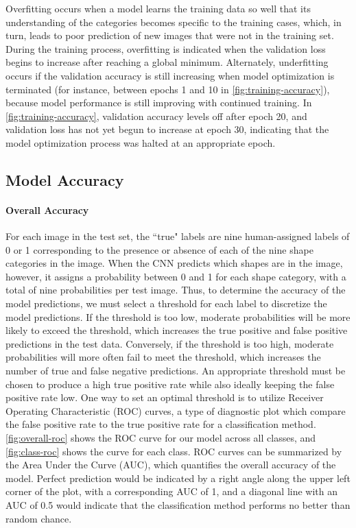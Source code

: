 \documentclass{article}\usepackage[]{graphicx}\usepackage[table]{xcolor}
\begin{document}
Overfitting occurs when a model learns the training data so well that its understanding of the categories becomes specific to the training cases, which, in turn, leads to poor prediction of new images that were not in the training set. During the training process, overfitting is indicated when the validation loss begins to increase after reaching a global minimum. Alternately, underfitting occurs if the validation accuracy is still increasing when model optimization is terminated (for instance, between epochs 1 and 10 in \autoref{fig:training-accuracy}), because model performance is still improving with continued training. In \autoref{fig:training-accuracy}, validation accuracy levels off after epoch 20, and validation loss has not yet begun to increase at epoch 30, indicating that the model optimization process was halted at an appropriate epoch.

\subsection{Model Accuracy}

\paragraph{Overall Accuracy}
For each image in the test set, the ``true" labels are nine human-assigned labels of 0 or 1 corresponding to the presence or absence of each of the nine shape categories in the image. When the CNN predicts which shapes are in the image, however, it assigns a probability between 0 and 1 for each shape category, with a total of nine probabilities per test image. Thus, to determine the accuracy of the model predictions, we must select a threshold for each label to discretize the model predictions. If the threshold is too low, moderate probabilities will be more likely to exceed the threshold, which increases the true positive and false positive predictions in the test data. Conversely, if the threshold is too high, moderate probabilities will more often fail to meet the threshold, which increases the number of true and false negative predictions. An appropriate threshold must be chosen to produce a high true positive rate while also ideally keeping the false positive rate low. One way to set an optimal threshold is to utilize Receiver Operating Characteristic (ROC) curves, a type of diagnostic plot which compare the false positive rate to the true positive rate for a classification method. \autoref{fig:overall-roc} shows the ROC curve for our model across all classes, and \autoref{fig:class-roc} shows the curve for each class. ROC curves can be summarized by the Area Under the Curve (AUC), which quantifies the overall accuracy of the model. Perfect prediction would be indicated by a right angle along the upper left corner of the plot, with a corresponding AUC of 1, and a diagonal line with an AUC of 0.5 would indicate that the classification method performs no better than random chance.
\end{document}
